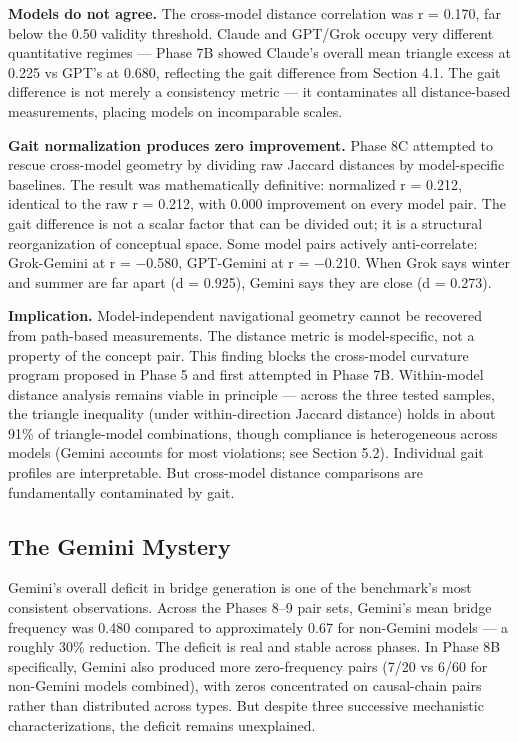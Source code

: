 \textbf{Models do not agree.} The cross-model distance correlation was r = 0.170, far below the 0.50 validity threshold. Claude and GPT/Grok occupy very different quantitative regimes --- Phase 7B showed Claude's overall mean triangle excess at 0.225 vs GPT's at 0.680, reflecting the gait difference from Section 4.1. The gait difference is not merely a consistency metric --- it contaminates all distance-based measurements, placing models on incomparable scales.

\textbf{Gait normalization produces zero improvement.} Phase 8C attempted to rescue cross-model geometry by dividing raw Jaccard distances by model-specific baselines. The result was mathematically definitive: normalized r = 0.212, identical to the raw r = 0.212, with 0.000 improvement on every model pair. The gait difference is not a scalar factor that can be divided out; it is a structural reorganization of conceptual space. Some model pairs actively anti-correlate: Grok-Gemini at r = −0.580, GPT-Gemini at r = −0.210. When Grok says winter and summer are far apart (d = 0.925), Gemini says they are close (d = 0.273).

\textbf{Implication.} Model-independent navigational geometry cannot be recovered from path-based measurements. The distance metric is model-specific, not a property of the concept pair. This finding blocks the cross-model curvature program proposed in Phase 5 and first attempted in Phase 7B. Within-model distance analysis remains viable in principle --- across the three tested samples, the triangle inequality (under within-direction Jaccard distance) holds in about 91\% of triangle-model combinations, though compliance is heterogeneous across models (Gemini accounts for most violations; see Section 5.2). Individual gait profiles are interpretable. But cross-model distance comparisons are fundamentally contaminated by gait.

\subsection{The Gemini Mystery}\label{the-gemini-mystery}

Gemini's overall deficit in bridge generation is one of the benchmark's most consistent observations. Across the Phases 8--9 pair sets, Gemini's mean bridge frequency was 0.480 compared to approximately 0.67 for non-Gemini models --- a roughly 30\% reduction. The deficit is real and stable across phases. In Phase 8B specifically, Gemini also produced more zero-frequency pairs (7/20 vs 6/60 for non-Gemini models combined), with zeros concentrated on causal-chain pairs rather than distributed across types. But despite three successive mechanistic characterizations, the deficit remains unexplained.


